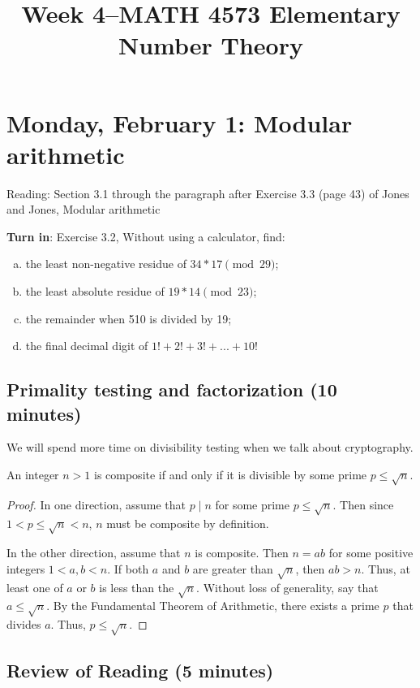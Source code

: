 \documentclass[letterpaper, 11 pt]{article}
\title{Week 4--MATH 4573 Elementary Number Theory}
\begin{document}
\maketitle
\tableofcontents

\section{Monday, February 1: Modular arithmetic}
Reading: Section 3.1 through the paragraph after Exercise 3.3 (page 43) of Jones and Jones, Modular arithmetic

{\bf Turn in}: Exercise 3.2, Without using a calculator, find: 
\begin{enumerate}[(a)]
 	\item the least non-negative residue of $34*17 \pmod{29}$; 
	\item the least absolute residue of $19*14 \pmod{23}$;
	\item the remainder when 510 is divided by 19;
	\item the final decimal digit of $1!+2!+3!+...+10!$
\end{enumerate}
\subsection{Primality testing and factorization (10 minutes)}
We will spend more time on divisibility testing when we talk about cryptography. 

\begin{lem}[Lemma 2.14]
 An integer $n>1$ is composite if and only if it is divisible by some prime $p\leq\sqrt{n}$.
\end{lem}
\begin{proof} In one direction, assume that $p\mid n$ for some prime $p\leq \sqrt{n}$.
Then since $1<p\leq \sqrt{n}<n$, $n$ must be composite by definition.

In the other direction, assume that $n$ is composite. Then $n=ab$ for some positive integers $1<a,b<n$. If both $a$ and $b$ are greater than $\sqrt{n}$, then $ab>n$. Thus, at least one of $a$ or $b$ is less than the $\sqrt{n}$. Without loss of generality, say that $a\leq \sqrt{n}$. By the Fundamental Theorem of Arithmetic, there exists a prime $p$ that divides $a$. Thus, $p\leq \sqrt{n}$.
\end{proof}

\subsection{Review of Reading (5 minutes)}
\end{document}
